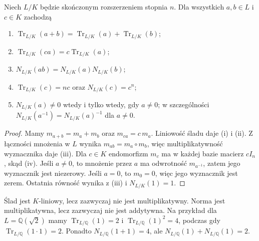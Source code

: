 \begin{twierdzenie}
\label{aa:tw:trace-norm-basic}
\label{aa:thm:trace-norm-properties}
Niech $L/K$ będzie skończonym rozszerzeniem stopnia $n$.
Dla wszystkich $a,b\in L$ i $c\in K$ zachodzą
\begin{enumerate}[label=\textup{(\roman*)}]
\item $\operatorname{Tr}_{L/K}(a+b)=\operatorname{Tr}_{L/K}(a)+\operatorname{Tr}_{L/K}(b)$;
\item $\operatorname{Tr}_{L/K}(ca)=c\operatorname{Tr}_{L/K}(a)$;
\item $N_{L/K}(ab)=N_{L/K}(a)N_{L/K}(b)$;
\item $\operatorname{Tr}_{L/K}(c)=nc$ oraz $N_{L/K}(c)=c^n$;
\item $N_{L/K}(a)\ne0$ wtedy i tylko wtedy, gdy $a\ne0$;
      w szczególności $N_{L/K}(a^{-1})=N_{L/K}(a)^{-1}$ dla $a\ne0$.
\end{enumerate}
\end{twierdzenie}
\begin{proof}
Mamy $m_{a+b}=m_a+m_b$ oraz $m_{ca}=c\,m_a$.
Liniowość śladu daje (i) i (ii). Z łączności mnożenia
w $L$ wynika $m_{ab}=m_a\circ m_b$, więc multiplikatywność
wyznacznika daje (iii). Dla $c\in K$ endomorfizm $m_c$
ma w każdej bazie macierz $cI_n$, skąd (iv).
Jeśli $a\ne0$, to mnożenie przez $a$ ma odwrotność $m_{a^{-1}}$,
zatem jego wyznacznik jest niezerowy. Jeśli $a=0$, to $m_0=0$,
więc jego wyznacznik jest zerem. Ostatnia równość wynika z (iii)
i $N_{L/K}(1)=1$.
\end{proof}

\begin{uwaga}
\label{aa:uw:trace-not-ring}
Ślad jest $K$-liniowy, lecz zazwyczaj nie jest multiplikatywny.
Norma jest multiplikatywna, lecz zazwyczaj nie jest addytywna.
Na przykład dla $L=\mathbb Q(\sqrt2)$ mamy
$\operatorname{Tr}_{L/\mathbb Q}(1)=2$ i
$\operatorname{Tr}_{L/\mathbb Q}(1)^2=4$,
podczas gdy $\operatorname{Tr}_{L/\mathbb Q}(1\cdot1)=2$.
Ponadto $N_{L/\mathbb Q}(1+1)=4$, ale
$N_{L/\mathbb Q}(1)+N_{L/\mathbb Q}(1)=2$.
\end{uwaga}

